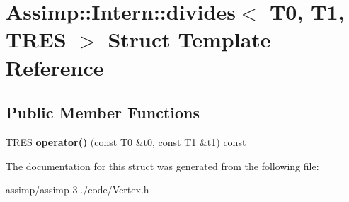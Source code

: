 \hypertarget{struct_assimp_1_1_intern_1_1divides}{\section{Assimp\+:\+:Intern\+:\+:divides$<$ T0, T1, T\+R\+E\+S $>$ Struct Template Reference}
\label{struct_assimp_1_1_intern_1_1divides}
}
\subsection*{Public Member Functions}
\begin{DoxyCompactItemize}
\item 
\hypertarget{struct_assimp_1_1_intern_1_1divides_a3fecf65c36f596d9498d54899b15c16a}{T\+R\+E\+S {\bfseries operator()} (const T0 \&t0, const T1 \&t1) const }\label{struct_assimp_1_1_intern_1_1divides_a3fecf65c36f596d9498d54899b15c16a}

\end{DoxyCompactItemize}


The documentation for this struct was generated from the following file\+:\begin{DoxyCompactItemize}
\item 
assimp/assimp-\/3../code/Vertex.\+h\end{DoxyCompactItemize}
